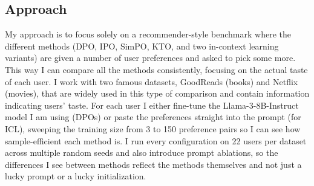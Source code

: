 \subsection{Approach}
\label{sec:intro:approach}


My approach is to focus solely on a recommender-style benchmark where the different methods (DPO, IPO, SimPO, KTO, and two in-context learning variants) are given a number of user preferences and asked to pick some more. This way I can compare all the methods consistently, focusing on the actual taste of each user. I work with two famous datasets, GoodReads (books) and Netflix (movies), that are widely used in this type of comparison and contain information indicating users' taste. For each user I either fine-tune the Llama-3-8B-Instruct model I am using (DPOs) or paste the preferences straight into the prompt (for ICL), sweeping the training size from 3 to 150 preference pairs so I can see how sample-efficient each method is. I run every configuration on 22 users per dataset across multiple random seeds and also introduce prompt ablations, so the differences I see between methods reflect the methods themselves and not just a lucky prompt or a lucky initialization.